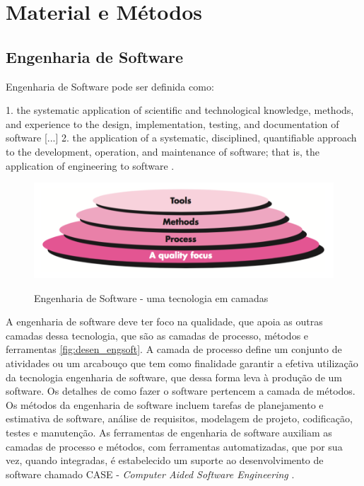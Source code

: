 \chapter{Material e Métodos}
\begin{quote}\normalfont\itshape\vspace*{-2\baselineskip}
\end{quote}

\section{Engenharia de Software}

Engenharia de Software pode ser definida como:
\begin{citacao}[english]
1. the systematic application of scientific and technological knowledge, methods, and experience to the design,
implementation, testing, and documentation of software [...]  2. the application
of a systematic, disciplined, quantifiable approach to the development, operation,
and maintenance of software; that is, the application of engineering to software \cite{IEEE2010}.
\end{citacao}

\begin{figure}[!b]
  \centering
  \caption{Engenharia de Software - uma tecnologia em camadas}
  \includegraphics[scale=0.33]{imagens/desenv_engsoft2}
  \label{fig:desen_engsoft}
\end{figure}

A engenharia de software deve ter foco na qualidade, que apoia as outras camadas
dessa tecnologia, que são as camadas de processo, métodos e ferramentas \autoref{fig:desen_engsoft}.
A camada de processo define um conjunto de atividades ou um arcabouço que tem
como finalidade garantir a efetiva utilização da tecnologia engenharia de software, que dessa forma
leva à produção de um software. Os detalhes de como fazer o software pertencem
a camada de métodos. Os métodos da engenharia de software incluem tarefas de planejamento
e estimativa de software, análise de requisitos, modelagem de projeto, codificação,
testes e manutenção. As ferramentas de engenharia de software auxiliam as camadas de
processo e métodos, com ferramentas automatizadas, que por sua vez, quando integradas,
é estabelecido um suporte ao desenvolvimento de software chamado CASE -
\textit{Computer Aided Software Engineering} \cite{Pressman2009, Sommerville2006}.

